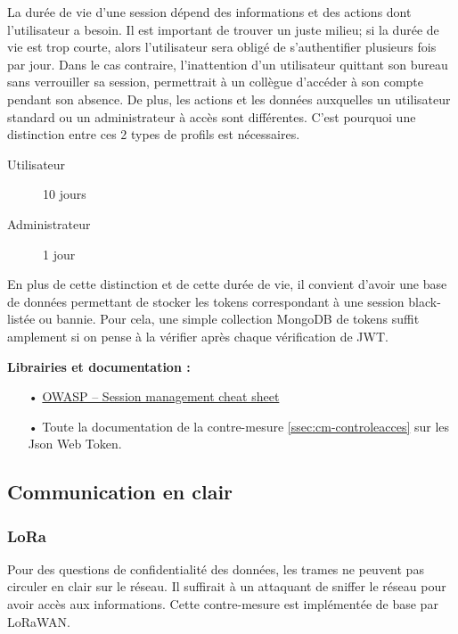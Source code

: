 La durée de vie d'une session dépend des informations et des actions dont l'utilisateur a besoin. Il est important de trouver un juste milieu; si la durée de vie est trop courte, alors l'utilisateur sera obligé de s'authentifier plusieurs fois par jour. Dans le cas contraire, l'inattention d'un utilisateur quittant son bureau sans verrouiller sa session, permettrait à un collègue d'accéder à son compte pendant son absence. De plus, les actions et les données auxquelles un utilisateur standard ou un administrateur à accès sont différentes. C'est pourquoi une distinction entre ces 2 types de profils est nécessaires.

\begin{description}
\item[Utilisateur] 10 jours
\item[Administrateur] 1 jour
\end{description}

En plus de cette distinction et de cette durée de vie, il convient d'avoir une base de données permettant de stocker les tokens correspondant à une session black-listée ou bannie. Pour cela, une simple collection MongoDB de tokens suffit amplement si on pense à la vérifier après chaque vérification de JWT.

\medskip
\textbf{Librairies et documentation :}

\begin{itemize}
\item[•] \href{https://www.owasp.org/index.php/Session_Management_Cheat_Sheet#Session_ID_Life_Cycle}{OWASP -- Session management cheat sheet}
\item[•] Toute la documentation de la contre-mesure \ref{ssec:cm-controleacces} sur les Json Web Token.
\end{itemize}

\subsection{Communication en clair}
\label{ssec:cm-tls}

\subsubsection{LoRa}

Pour des questions de confidentialité des données, les trames ne peuvent pas circuler en clair sur le réseau. Il suffirait à un attaquant de sniffer le réseau pour avoir accès aux informations. Cette contre-mesure est implémentée de base par LoRaWAN.

